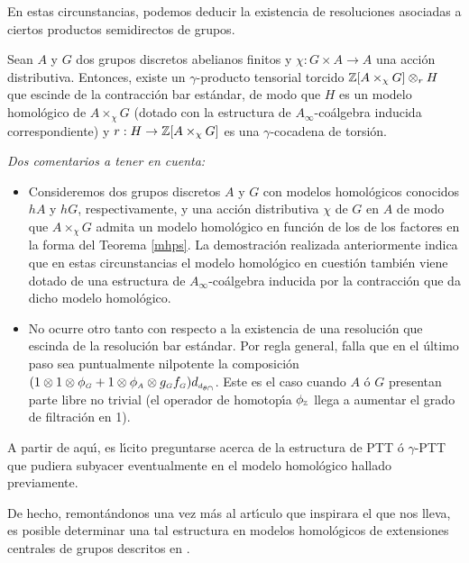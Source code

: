 En estas circunstancias, podemos deducir la existencia de
resoluciones asociadas a ciertos productos semidirectos de grupos.

\begin{thr}
Sean $A$ y $G$ dos grupos discretos abelianos finitos y $\chi :G
\times A \rightarrow A$ una acci\'{o}n distributiva. Entonces,
existe un $\gamma$-producto tensorial torcido ${\Bbb Z} [A \times _\chi
G] \otimes _r H$ que escinde de la contracci\'{o}n bar
est\'{a}ndar, de modo que $H$ es un modelo homol\'{o}gico de $A
\times _\chi G$ (dotado con la estructura de
$A_\infty$-co\'{a}lgebra inducida correspondiente) y $r:H
\rightarrow {\Bbb Z}[A \times _\chi G]$ es una $\gamma$-cocadena de
torsi\'{o}n.
\end{thr}

\begin{rmk} {\em Dos comentarios a tener en cuenta:
\begin{itemize}
\item Consideremos dos grupos discretos $A$ y $G$ con modelos
homol\'{o}gicos conocidos $hA$ y $hG$, respectivamente, y una
acci\'{o}n distributiva $\chi$ de $G$ en $A$ de modo que $A \times
_\chi G$ admita un modelo homol\'{o}gico en funci\'{o}n de los de los
factores en la forma del Teorema \ref{mhps}. La demostraci\'{o}n
realizada anteriormente indica que en estas circunstancias el
modelo homol\'{o}gico en cuesti\'{o}n tambi\'{e}n viene dotado de una
estructura de $A_\infty$-co\'{a}lgebra inducida por la contracci\'{o}n
que da dicho modelo homol\'{o}gico.
\item No ocurre otro tanto con respecto a la existencia de una
resoluci\'{o}n que escinda de la resoluci\'{o}n bar est\'{a}ndar. Por
regla general, falla que en el \'{u}ltimo paso sea puntualmente
nilpotente la composici\'{o}n $(1 \otimes 1 \otimes \phi _{\scriptscriptstyle G}+
1 \otimes \phi _{\scriptscriptstyle A} \otimes g_{\scriptscriptstyle G}f_{\scriptscriptstyle G})d_{\scriptscriptstyle
d_{\theta \cap}}$. Este es el caso cuando $A$ \'{o} $G$ presentan
parte libre no trivial (el operador de homotop\'{\i}a $\phi
_{\scriptscriptstyle {\Bbb Z}}$ llega a aumentar el grado de filtraci\'{o}n en 1).
\end{itemize}}
\end{rmk}

A partir de aqu\'{\i}, es l\'{\i}cito preguntarse acerca de la
estructura de PTT \'{o} $\gamma$-PTT que pudiera subyacer
eventualmente en el modelo homol\'{o}gico hallado previamente.

De hecho, remont\'{a}ndonos una vez m\'{a}s al art\'{\i}culo que
inspirara el que nos lleva, es posible determinar una tal
estructura en modelos
homol\'{o}gicos de extensiones centrales de grupos descritos en
\cite{LS87}.

